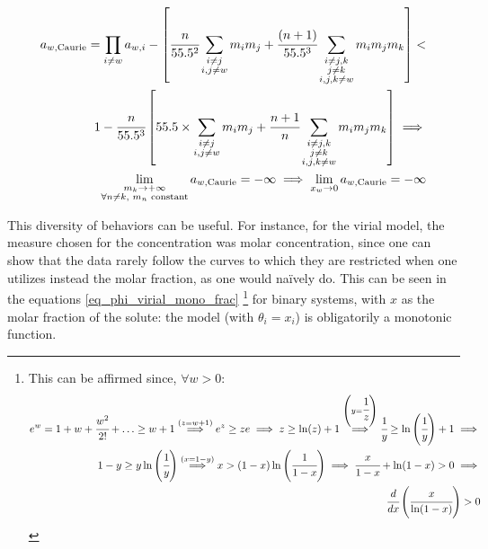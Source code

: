 \documentclass[
	12pt,				%
	openright,
	twoside,
	a4paper,			%
	brazil,			%
	french,				%
	english				%
	]{abntex2}
\begin{document}
\begin{equation}
	\label{eq_caurie_fail}
	\begin{split}
		a_{w,\text{Caurie}} = \prod_{i \neq w}a_{w,i} - \left[\cfrac{n}%
			{55.5^2}\sum_{\substack{i \neq j \\ i,j \neq w}}%
			m_im_j + \cfrac{(n+1)}{55.5^3}\sum_{%
			\substack{i\neq j,k \\ j \neq k \\  i,j,k \neq w}}
			m_im_jm_k\right] <\\
		1 - \cfrac{n}{55.5^3}\left[55.5 \times%
			\sum_{\substack{i \neq j \\ i,j \neq w}}%
			m_im_j + \cfrac{n+1}{n}\sum_{%
			\substack{i\neq j,k \\ j \neq k \\  i,j,k \neq w}}
			m_im_jm_k\right]\implies\\
		\lim_{\substack{m_k \to +\infty \\%
				\forall n \neq k, \text{ $m_n$ constant}}}%
			a_{w,\text{Caurie}} = -\infty \implies%
		\lim_{x_w \to 0} a_{w,\text{Caurie}} = -\infty
	\end{split}
\end{equation}

This diversity of behaviors can be useful. For instance, for the virial model,
the measure chosen for the concentration was molar concentration, since one can
show that the data rarely follow the curves to which they are restricted when
one utilizes instead the molar fraction, as one would naïvely do. This can be
seen in the equations \ref{eq_phi_virial_mono_frac}
\footnote{%
	This can be affirmed since, $\forall w > 0$:
	\begin{equation*}
		\begin{split}
			e^w = 1 + w + \cfrac{w^2}{2!} + \ldots \ge w +1
			\stackrel{(z = w+1)}{\implies} e^z \ge ze \implies
				z \ge \ln(z) + 1
			\stackrel{\left(y=\cfrac{1}{z}\right)}{\implies}
				\cfrac{1}{y} \ge
				\ln\left(\cfrac{1}{y}\right) + 1 \implies\\
			1-y \ge y\ln\left(\cfrac{1}{y}\right)
			\stackrel{(x=1-y)}{\implies} x >
				(1-x)\ln\left(\cfrac{1}{1-x}\right)\implies
			\cfrac{x}{1-x} + \ln(1-x) > 0 \implies\\
				\cfrac{d}{dx}\left(\cfrac{x}{\ln(1-x)}\right) > 0
		\end{split}
	\end{equation*}
}
for binary systems, with $x$ as the molar fraction of the solute: the model
(with $\theta_i = x_i$) is obligatorily a monotonic function.
\end{document}

